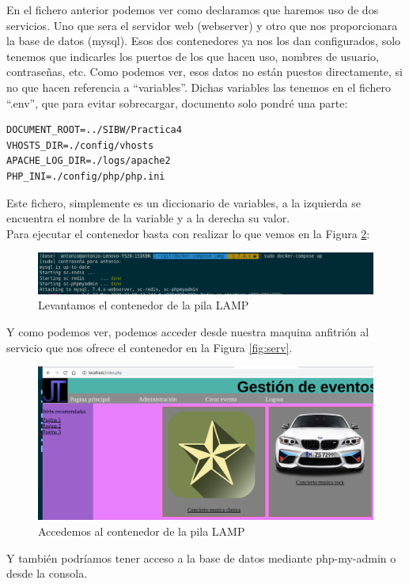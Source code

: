 \documentclass[11pt,a4paper]{article}
\begin{document}
En el fichero anterior podemos ver como declaramos que haremos uso de dos servicios. Uno que sera el servidor web (webserver) y otro que nos proporcionara la base de datos (mysql). Esos dos contenedores ya nos los dan configurados, solo tenemos que indicarles los puertos de los que hacen uso, nombres de usuario, contraseñas, etc. Como podemos ver, esos datos no están puestos directamente, si no que hacen referencia a ``variables''. Dichas variables las tenemos en el fichero ``.env'', que para evitar sobrecargar, documento solo pondré una parte:
\begin{verbatim}
DOCUMENT_ROOT=../SIBW/Practica4
VHOSTS_DIR=./config/vhosts
APACHE_LOG_DIR=./logs/apache2
PHP_INI=./config/php/php.ini
\end{verbatim}
Este fichero, simplemente es un diccionario de variables, a la izquierda se encuentra el nombre de la variable y a la derecha su valor.\\
Para ejecutar el contenedor basta con realizar lo que vemos en la Figura \ref{fig:dock}:
\begin{figure}[H]
	\centering
	\includegraphics[scale=0.3]{images/docker-compose.png}
	\caption[docker-compose up]{Levantamos el contenedor de la pila LAMP}
	\label{fig:dock}
\end{figure}
Y como podemos ver, podemos acceder desde nuestra maquina anfitrión al servicio que nos ofrece el contenedor en la Figura \ref{fig:serv}.
\begin{figure}[H]
	\centering
	\includegraphics[scale=0.3]{images/a.png}
	\caption[Acceso a la pila LAMP]{Accedemos al contenedor de la pila LAMP}
	\label{fig:dock}
\end{figure}
Y también podríamos tener acceso a la base de datos mediante php-my-admin o desde la consola.
\end{document}
